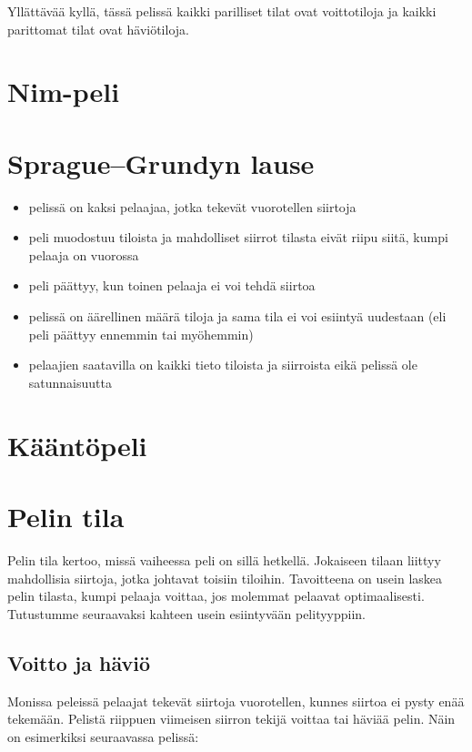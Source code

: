 Yllättävää kyllä, tässä pelissä kaikki
parilliset tilat ovat voittotiloja ja
kaikki parittomat tilat ovat häviötiloja.

\section{Nim-peli}

\section{Sprague–Grundyn lause}

\begin{itemize}[noitemsep]
\item pelissä on kaksi pelaajaa, jotka tekevät vuorotellen siirtoja
\item peli muodostuu tiloista ja mahdolliset siirrot tilasta
eivät riipu siitä, kumpi pelaaja on vuorossa
\item peli päättyy, kun toinen pelaaja ei voi tehdä siirtoa
\item pelissä on äärellinen määrä tiloja ja sama tila ei voi
esiintyä uudestaan (eli peli päättyy ennemmin tai myöhemmin)
\item pelaajien saatavilla on kaikki tieto tiloista
ja siirroista eikä pelissä ole satunnaisuutta
\end{itemize}


\section{Kääntöpeli}

\section{Pelin tila}

Pelin tila kertoo, missä vaiheessa peli on
sillä hetkellä. Jokaiseen tilaan liittyy
mahdollisia siirtoja, jotka johtavat toisiin tiloihin.
Tavoitteena on usein laskea pelin tilasta,
kumpi pelaaja voittaa, jos molemmat pelaavat
optimaalisesti.
Tutustumme seuraavaksi kahteen usein esiintyvään pelityyppiin.


\subsection{Voitto ja häviö}

Monissa peleissä pelaajat tekevät siirtoja
vuorotellen, kunnes siirtoa ei pysty enää tekemään.
Pelistä riippuen viimeisen siirron tekijä
voittaa tai häviää pelin.
Näin on esimerkiksi seuraavassa pelissä:

